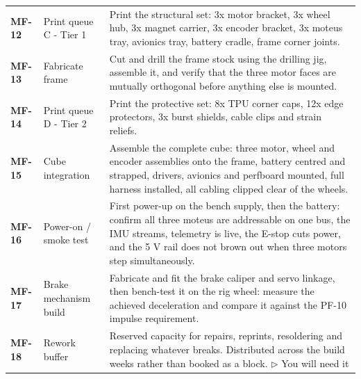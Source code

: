 {\begin{longtable}{@{}L{1.1cm} L{3.0cm} L{11.0cm}@{}}
\textbf{MF-12} & Print queue C - Tier 1 & Print the structural set: 3x motor bracket, 3x wheel hub, 3x magnet carrier, 3x encoder bracket, 3x moteus tray, avionics tray, battery cradle, frame corner joints. \\[2pt]
\textbf{MF-13} & Fabricate frame & Cut and drill the frame stock using the drilling jig, assemble it, and verify that the three motor faces are mutually orthogonal before anything else is mounted. \\[2pt]
\textbf{MF-14} & Print queue D - Tier 2 & Print the protective set: 8x TPU corner caps, 12x edge protectors, 3x burst shields, cable clips and strain reliefs. \\[2pt]
\textbf{MF-15} & Cube integration & Assemble the complete cube: three motor, wheel and encoder assemblies onto the frame, battery centred and strapped, drivers, avionics and perfboard mounted, full harness installed, all cabling clipped clear of the wheels. \\[2pt]
\textbf{MF-16} & Power-on / smoke test & First power-up on the bench supply, then the battery: confirm all three moteus are addressable on one bus, the IMU streams, telemetry is live, the E-stop cuts power, and the 5 V rail does not brown out when three motors step simultaneously. \\[2pt]
\textbf{MF-17} & Brake mechanism build & Fabricate and fit the brake caliper and servo linkage, then bench-test it on the rig wheel: measure the achieved deceleration and compare it against the PF-10 impulse requirement. \\[2pt]
\textbf{MF-18} & Rework buffer & Reserved capacity for repairs, reprints, resoldering and replacing whatever breaks. Distributed across the build weeks rather than booked as a block. \newline\textcolor{p0col}{\footnotesize$\triangleright$ You will need it} \\[2pt]
\end{longtable}
}

